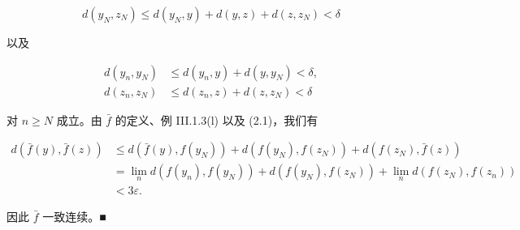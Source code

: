 \begin{theorem}
\begin{subitems}
\[
d(y_N, z_N) \le d(y_N, y) + d(y, z) + d(z, z_N) < \delta
\]

以及

\begin{equation*}
\begin{aligned}
d(y_n, y_N) &\le d(y_n, y) + d(y, y_N) < \delta, \\ d(z_n, z_N) &\le d(z_n, z) + d(z, z_N) < \delta
\end{aligned}
\end{equation*}

对 $ n \ge N $ 成立。由 $ \bar{f} $ 的定义、例 III.1.3(l) 以及 (2.1)，我们有

\begin{equation*}
\begin{aligned}
d(\bar{f}(y), \bar{f}(z)) &\le d(\bar{f}(y), f(y_N)) + d(f(y_N), f(z_N)) + d(f(z_N), \bar{f}(z)) \\ &= \lim_n d(f(y_n), f(y_N)) + d(f(y_N), f(z_N)) + \lim_n d(f(z_N), f(z_n)) \\ &< 3\varepsilon.
\end{aligned}
\end{equation*}

因此 $ \bar{f} $ 一致连续。\nobreak\hspace{0.35em}■

\end{subitems}

\end{theorem}

